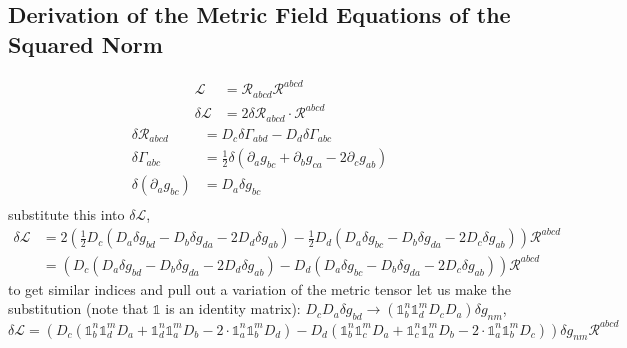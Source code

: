 \documentclass[aps,prd,preprint]{revtex4-1}
\begin{document}
\appendix

\begin{fleqn}
\section{Derivation of the Metric Field Equations of the Squared Norm}\label{app.derv_metric_field_eqs}
\begin{equation*}
\begin{aligned}
    \mathcal{L} &= \mathcal{R}_{abcd} \mathcal{R}^{abcd} \\
    \delta \mathcal{L} &= 2 \delta \mathcal{R}_{abcd} \cdot \mathcal{R}^{abcd}
\end{aligned}
\end{equation*}
\begin{equation*}
\begin{aligned}
    \delta \mathcal{R}_{abcd} &= D_c \delta \Gamma_{abd} - D_d \delta \Gamma_{abc} \\
    \delta \Gamma_{abc} &= \frac{1}{2} \delta(\partial_a g_{bc} + \partial_b g_{ca} - 2 \partial_c g_{ab}) \\
    \delta (\partial_a g_{bc}) &= D_a \delta g_{bc} \\
\end{aligned}
\end{equation*}
substitute this into $\delta \mathcal{L}$,
\begin{align*}
    \delta \mathcal{L} &= 2\left( \frac{1}{2} D_c (D_a \delta g_{bd} - D_b \delta g_{da} - 2 D_d \delta g_{ab}) - \frac{1}{2} D_d (D_a \delta g_{bc} - D_b \delta g_{da} - 2 D_c \delta g_{ab}) \right) \mathcal{R}^{abcd} \\
    &= \left( D_c (D_a \delta g_{bd} - D_b \delta g_{da} - 2 D_d \delta g_{ab}) - D_d (D_a \delta g_{bc} - D_b \delta g_{da} - 2 D_c \delta g_{ab}) \right) \mathcal{R}^{abcd}
\end{align*}
to get similar indices and pull out a variation of the metric tensor let us make the substitution (note that $\mathds{1}$ is an identity matrix): $D_c D_a \delta g_{bd} \rightarrow (\mathds{1}^n_b \mathds{1}^m_d D_c D_a) \delta g_{nm}$,
\begin{equation*}
    \delta \mathcal{L} = \left( D_c (\mathds{1}^n_b \mathds{1}^m_d D_a + \mathds{1}^n_d \mathds{1}^m_a D_b - 2 \cdot \mathds{1}^n_a \mathds{1}^m_b D_d) - D_d (\mathds{1}^n_b \mathds{1}^m_c D_a + \mathds{1}^n_c \mathds{1}^m_a D_b - 2 \cdot \mathds{1}^n_a \mathds{1}^m_b D_c) \right) \delta g_{nm} \mathcal{R}^{abcd}
\end{equation*}

\end{fleqn}
\end{document}
